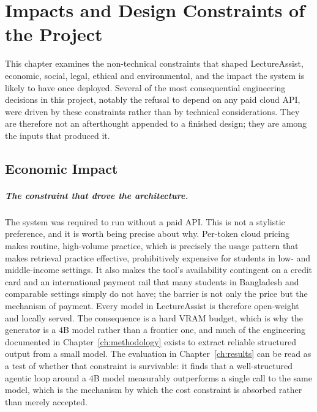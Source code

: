\chapter{Impacts and Design Constraints of the Project}
\label{ch:impacts}

This chapter examines the non-technical constraints that shaped LectureAssist,
economic, social, legal, ethical and environmental, and the impact the system
is likely to have once deployed. Several of the most consequential engineering
decisions in this project, notably the refusal to depend on any paid cloud
API, were driven by these constraints rather than by technical considerations.
They are therefore not an afterthought appended to a finished design; they are
among the inputs that produced it.

\section{Economic Impact}
\label{sec:impacts-economic}

\paragraph{The constraint that drove the architecture.} The system was
required to run without a paid API. This is not a stylistic preference, and it is
worth being precise about why. Per-token cloud pricing makes routine, high-volume
practice, which is precisely the usage pattern that makes retrieval practice
effective, prohibitively expensive for students in low- and middle-income
settings. It also makes the tool's availability contingent on a credit card and an
international payment rail that many students in Bangladesh and comparable settings
simply do not have; the barrier is not only the price but the mechanism of payment.
Every model in LectureAssist is therefore open-weight and locally served. The
consequence is a hard VRAM budget, which is why the generator is a $4$B model rather
than a frontier one, and much of the engineering documented in
Chapter~\ref{ch:methodology} exists to extract reliable structured output from a
small model. The evaluation in Chapter~\ref{ch:results} can be read as a test of
whether that constraint is survivable: it finds that a well-structured agentic loop
around a $4$B model measurably outperforms a single call to the same model, which is
the mechanism by which the cost constraint is absorbed rather than merely accepted.

